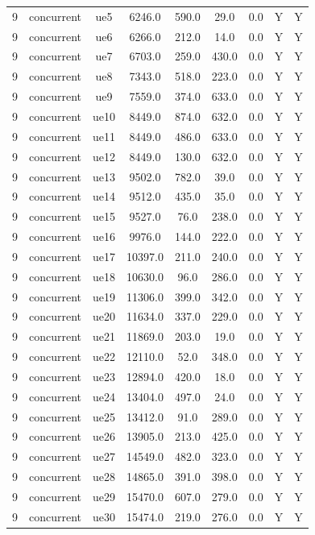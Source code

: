 \begin{table}[ht]
\begin{tabular}{|c|c|c|c|c|c|c|c|c|}
9 & concurrent & ue5 & 6246.0 & 590.0 & 29.0 & 0.0 & Y & Y \\
9 & concurrent & ue6 & 6266.0 & 212.0 & 14.0 & 0.0 & Y & Y \\
9 & concurrent & ue7 & 6703.0 & 259.0 & 430.0 & 0.0 & Y & Y \\
9 & concurrent & ue8 & 7343.0 & 518.0 & 223.0 & 0.0 & Y & Y \\
9 & concurrent & ue9 & 7559.0 & 374.0 & 633.0 & 0.0 & Y & Y \\
9 & concurrent & ue10 & 8449.0 & 874.0 & 632.0 & 0.0 & Y & Y \\
9 & concurrent & ue11 & 8449.0 & 486.0 & 633.0 & 0.0 & Y & Y \\
9 & concurrent & ue12 & 8449.0 & 130.0 & 632.0 & 0.0 & Y & Y \\
9 & concurrent & ue13 & 9502.0 & 782.0 & 39.0 & 0.0 & Y & Y \\
9 & concurrent & ue14 & 9512.0 & 435.0 & 35.0 & 0.0 & Y & Y \\
9 & concurrent & ue15 & 9527.0 & 76.0 & 238.0 & 0.0 & Y & Y \\
9 & concurrent & ue16 & 9976.0 & 144.0 & 222.0 & 0.0 & Y & Y \\
9 & concurrent & ue17 & 10397.0 & 211.0 & 240.0 & 0.0 & Y & Y \\
9 & concurrent & ue18 & 10630.0 & 96.0 & 286.0 & 0.0 & Y & Y \\
9 & concurrent & ue19 & 11306.0 & 399.0 & 342.0 & 0.0 & Y & Y \\
9 & concurrent & ue20 & 11634.0 & 337.0 & 229.0 & 0.0 & Y & Y \\
9 & concurrent & ue21 & 11869.0 & 203.0 & 19.0 & 0.0 & Y & Y \\
9 & concurrent & ue22 & 12110.0 & 52.0 & 348.0 & 0.0 & Y & Y \\
9 & concurrent & ue23 & 12894.0 & 420.0 & 18.0 & 0.0 & Y & Y \\
9 & concurrent & ue24 & 13404.0 & 497.0 & 24.0 & 0.0 & Y & Y \\
9 & concurrent & ue25 & 13412.0 & 91.0 & 289.0 & 0.0 & Y & Y \\
9 & concurrent & ue26 & 13905.0 & 213.0 & 425.0 & 0.0 & Y & Y \\
9 & concurrent & ue27 & 14549.0 & 482.0 & 323.0 & 0.0 & Y & Y \\
9 & concurrent & ue28 & 14865.0 & 391.0 & 398.0 & 0.0 & Y & Y \\
9 & concurrent & ue29 & 15470.0 & 607.0 & 279.0 & 0.0 & Y & Y \\
9 & concurrent & ue30 & 15474.0 & 219.0 & 276.0 & 0.0 & Y & Y \\

\end{tabular}
\end{table}
